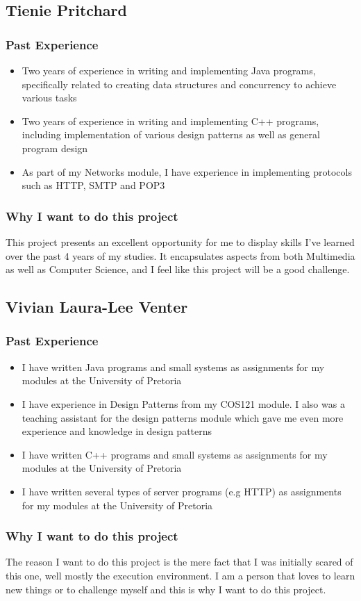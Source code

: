\pagebreak
\subsection{Tienie Pritchard}

\subsubsection{Past Experience} 
\begin{itemize}
	\item{Two years of experience in writing and implementing Java programs, specifically related to creating data structures and concurrency to achieve various tasks}
	\item{Two years of experience in writing and implementing C++ programs, including implementation of various design patterns as well as general program design}
	\item{As part of my Networks module, I have experience in implementing protocols such as HTTP, SMTP and POP3}
\end{itemize}
\subsubsection{Why I want to do this project}
This project presents an excellent opportunity for me to display skills I've learned over the past 4 years of my studies. It encapsulates aspects from both Multimedia as well as Computer Science, and I feel like this project will be a good challenge. 


\pagebreak
\subsection{Vivian Laura-Lee Venter}

\subsubsection{Past Experience} 
\begin{itemize}
	\item{I have written Java programs and small systems as assignments for my modules at the University of Pretoria}
	\item{I have experience in Design Patterns from my COS121 module. I also was a teaching assistant for the design patterns module which gave me even more experience and knowledge in design patterns}
	\item{I have written C++ programs and small systems as assignments for my modules at the University of Pretoria}
	\item{I have written several types of server programs (e.g HTTP) as assignments for my modules at the University of Pretoria}
\end{itemize}
\subsubsection{Why I want to do this project}
The reason I want to do this project is the mere fact that I was initially scared of this one, well mostly the execution environment. I am a person that loves to learn new things or to challenge myself and this is why I want to do this project.


